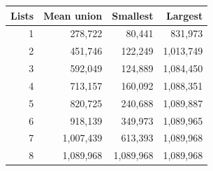 \begin{tabular}{rrrr}
\toprule
Lists & Mean union & Smallest & Largest \\
\midrule
1 & 278,722 & 80,441 & 831,973 \\
2 & 451,746 & 122,249 & 1,013,749 \\
3 & 592,049 & 124,889 & 1,084,450 \\
4 & 713,157 & 160,092 & 1,088,351 \\
5 & 820,725 & 240,688 & 1,089,887 \\
6 & 918,139 & 349,973 & 1,089,965 \\
7 & 1,007,439 & 613,393 & 1,089,968 \\
8 & 1,089,968 & 1,089,968 & 1,089,968 \\
\bottomrule
\end{tabular}

